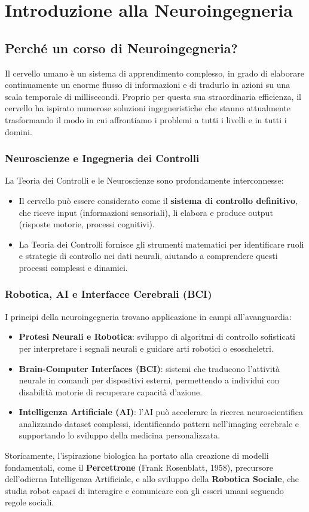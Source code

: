 \chapter{Introduzione alla Neuroingegneria}

\section{Perché un corso di Neuroingegneria?}
Il cervello umano è un sistema di apprendimento complesso, in grado di elaborare continuamente un enorme flusso di informazioni e di tradurlo in azioni su una scala temporale di millisecondi. Proprio per questa sua straordinaria efficienza, il cervello ha ispirato numerose soluzioni ingegneristiche che stanno attualmente trasformando il modo in cui affrontiamo i problemi a tutti i livelli e in tutti i domini.

\subsection{Neuroscienze e Ingegneria dei Controlli}
La Teoria dei Controlli e le Neuroscienze sono profondamente interconnesse:
\begin{itemize}
    \item Il cervello può essere considerato come il \textbf{sistema di controllo definitivo}, che riceve input (informazioni sensoriali), li elabora e produce output (risposte motorie, processi cognitivi).
    \item La Teoria dei Controlli fornisce gli strumenti matematici per identificare ruoli e strategie di controllo nei dati neurali, aiutando a comprendere questi processi complessi e dinamici.
\end{itemize}

\subsection{Robotica, AI e Interfacce Cerebrali (BCI)}
I principi della neuroingegneria trovano applicazione in campi all'avanguardia:
\begin{itemize}
    \item \textbf{Protesi Neurali e Robotica}: sviluppo di algoritmi di controllo sofisticati per interpretare i segnali neurali e guidare arti robotici o esoscheletri.
    \item \textbf{Brain-Computer Interfaces (BCI)}: sistemi che traducono l'attività neurale in comandi per dispositivi esterni, permettendo a individui con disabilità motorie di recuperare capacità d'azione.
    \item \textbf{Intelligenza Artificiale (AI)}: l'AI può accelerare la ricerca neuroscientifica analizzando dataset complessi, identificando pattern nell'imaging cerebrale e supportando lo sviluppo della medicina personalizzata.
\end{itemize}
Storicamente, l'ispirazione biologica ha portato alla creazione di modelli fondamentali, come il \textbf{Percettrone} (Frank Rosenblatt, 1958), precursore dell'odierna Intelligenza Artificiale, e allo sviluppo della \textbf{Robotica Sociale}, che studia robot capaci di interagire e comunicare con gli esseri umani seguendo regole sociali.

